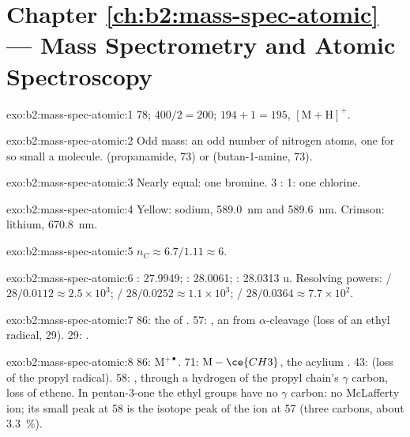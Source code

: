 \section*{Chapter \ref{ch:b2:mass-spec-atomic} --- Mass Spectrometry and Atomic Spectroscopy}

\begin{solution}{exo:b2:mass-spec-atomic:1}
78; $400/2 = 200$; $194 + 1 = 195$, $[\mathrm M + \mathrm H]^+$.
\end{solution}

\begin{solution}{exo:b2:mass-spec-atomic:2}
Odd mass: an odd number of nitrogen atoms, one for so small a molecule.  (propanamide, 73)
or  (butan-1-amine, 73).
\end{solution}

\begin{solution}{exo:b2:mass-spec-atomic:3}
Nearly equal: one bromine. 3 : 1: one chlorine.
\end{solution}

\begin{solution}{exo:b2:mass-spec-atomic:4}
Yellow: sodium, \qty{589.0}{nm} and \qty{589.6}{nm}. Crimson: lithium, \qty{670.8}{nm}.
\end{solution}

\begin{solution}{exo:b2:mass-spec-atomic:5}
$n_C \approx 6.7/1.11 \approx 6$.
\end{solution}

\begin{solution}{exo:b2:mass-spec-atomic:6}
: 27.9949; : 28.0061; : 28.0313 u. Resolving powers: / $28/0.0112
\approx 2.5 \times 10^3$; / $28/0.0252 \approx 1.1 \times 10^3$; /
$28/0.0364 \approx 7.7 \times 10^2$.
\end{solution}

\begin{solution}{exo:b2:mass-spec-atomic:7}
86: the  of . 57: , an  from $\alpha$-cleavage (loss of
an ethyl radical, 29). 29: .
\end{solution}

\begin{solution}{exo:b2:mass-spec-atomic:8}
86: $\mathrm M^{+\bullet}$. 71: $\mathrm M - \ce{CH3}$, the acylium . 43: 
(loss of the propyl radical). 58: , through a hydrogen of the propyl chain's
$\gamma$ carbon, loss of ethene. In pentan-3-one the ethyl groups have no $\gamma$ carbon: no
McLafferty ion; its small peak at 58 is the  isotope peak of the ion at 57 (three carbons,
about 3.3~\%).
\end{solution}

